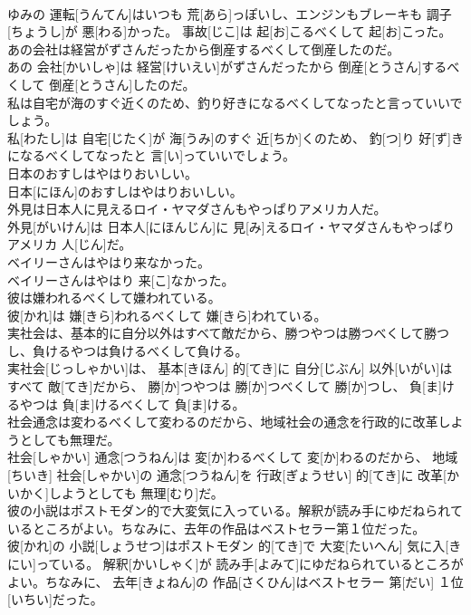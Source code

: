 \documentclass[8pt]{extreport}
\begin{document}
\begin{CJK}{UTF8}{min}
\\	ゆみの 運転[うんてん]はいつも 荒[あら]っぽいし、エンジンもブレーキも 調子[ちょうし]が 悪[わる]かった。 事故[じこ]は 起[お]こるべくして 起[お]こった。
\\	あの会社は経営がずさんだったから倒産するべくして倒産したのだ。	
\\	あの 会社[かいしゃ]は 経営[けいえい]がずさんだったから 倒産[とうさん]するべくして 倒産[とうさん]したのだ。
\\	私は自宅が海のすぐ近くのため、釣り好きになるべくしてなったと言っていいでしょう。	
\\	私[わたし]は 自宅[じたく]が 海[うみ]のすぐ 近[ちか]くのため、 釣[つ]り 好[ず]きになるべくしてなったと 言[い]っていいでしょう。
\\	日本のおすしはやはりおいしい。	
\\	日本[にほん]のおすしはやはりおいしい。
\\	外見は日本人に見えるロイ・ヤマダさんもやっぱりアメリカ人だ。	
\\	外見[がいけん]は 日本人[にほんじん]に 見[み]えるロイ・ヤマダさんもやっぱりアメリカ 人[じん]だ。
\\	ベイリーさんはやはり来なかった。	
\\	ベイリーさんはやはり 来[こ]なかった。
\\	彼は嫌われるべくして嫌われている。	
\\	彼[かれ]は 嫌[きら]われるべくして 嫌[きら]われている。
\\	実社会は、基本的に自分以外はすべて敵だから、勝つやつは勝つべくして勝つし、負けるやつは負けるべくして負ける。	
\\	実社会[じっしゃかい]は、 基本[きほん] 的[てき]に 自分[じぶん] 以外[いがい]はすべて 敵[てき]だから、 勝[か]つやつは 勝[か]つべくして 勝[か]つし、 負[ま]けるやつは 負[ま]けるべくして 負[ま]ける。
\\	社会通念は変わるべくして変わるのだから、地域社会の通念を行政的に改革しようとしても無理だ。	
\\	社会[しゃかい] 通念[つうねん]は 変[か]わるべくして 変[か]わるのだから、 地域[ちいき] 社会[しゃかい]の 通念[つうねん]を 行政[ぎょうせい] 的[てき]に 改革[かいかく]しようとしても 無理[むり]だ。
\\	彼の小説はポストモダン的で大変気に入っている。解釈が読み手にゆだねられているところがよい。ちなみに、去年の作品はベストセラー第１位だった。	
\\	彼[かれ]の 小説[しょうせつ]はポストモダン 的[てき]で 大変[たいへん] 気に入[きにい]っている。 解釈[かいしゃく]が 読み手[よみて]にゆだねられているところがよい。ちなみに、 去年[きょねん]の 作品[さくひん]はベストセラー 第[だい] １位[いちい]だった。

\end{CJK}
\end{document}
